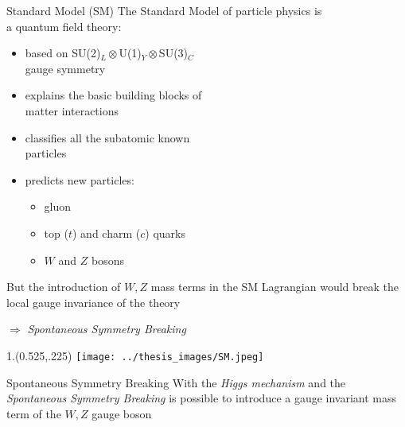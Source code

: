 \documentclass[10pt,UKenglish, leqno, xcolor = dvipsnames]{beamer}
\begin{document}
	\begin{frame}{Standard Model (SM)}
		\vfill
		The Standard Model of particle physics is\\ a quantum field theory:
		\begin{itemize}
			\item based on SU(2)$_L\otimes$U(1)$_Y\otimes$SU(3)$_C$\\ gauge symmetry
			\item explains the basic building blocks of\\ matter interactions
			\item classifies all the subatomic known\\ particles
			\item predicts new particles:
			\begin{itemize}
				\item gluon
				\item top ($t$) and charm ($c$) quarks
				\item $W$ and $Z$ bosons
			\end{itemize}
		\end{itemize}
		But the introduction of $W,Z$ mass terms in the SM Lagrangian would break the local gauge invariance of the theory\\ 
		\begin{center}
			$\Rightarrow$ \textit{Spontaneous Symmetry Breaking}
		\end{center}
		\vfill
		\begin{textblock}{1.}(0.525,.225)
			\texttt{[image: ../thesis\_images/SM.jpeg]}
		\end{textblock}
	\end{frame}

	\begin{frame}{Spontaneous Symmetry Breaking}
		With the \textit{Higgs mechanism} and the \textit{Spontaneous Symmetry Breaking} is possible to introduce a gauge invariant mass term of the $W,Z$ gauge boson
	\end{frame}
\end{document}
